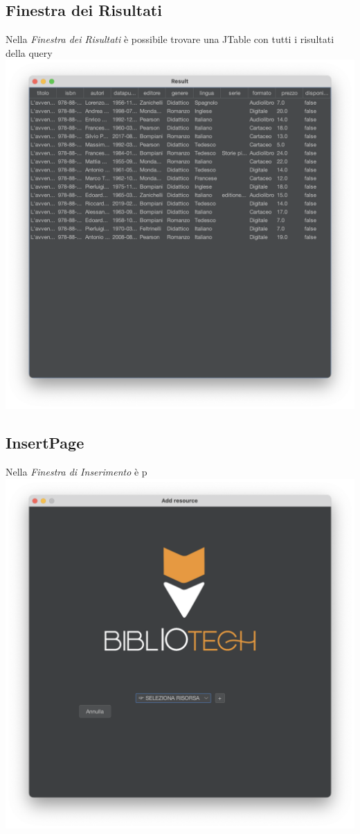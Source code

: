  \subsection{Finestra dei Risultati}
 Nella \textit{Finestra dei Risultati} è possibile trovare una JTable con tutti i risultati della query
 \\
 \includegraphics[scale=0.25, center]{Immagini/Schermate/Search/ResultPage.png}

 \subsection{InsertPage}
 Nella \textit{Finestra di Inserimento} è p
 \includegraphics[scale=0.25, center]{Immagini/Schermate/Insert/InserisciRisorsaPage.png}

